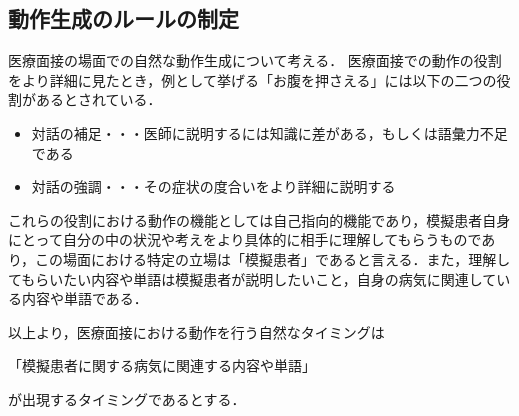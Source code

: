 \subsection{動作生成のルールの制定}\label{}
医療面接の場面での自然な動作生成について考える．
医療面接での動作の役割をより詳細に見たとき，例として挙げる「お腹を押さえる」には以下の二つの役割があるとされている．

 \begin{itemize}
  \item 対話の補足・・・医師に説明するには知識に差がある，もしくは語彙力不足である
  \item 対話の強調・・・その症状の度合いをより詳細に説明する
 \end{itemize}
\par
これらの役割における動作の機能としては自己指向的機能であり，模擬患者自身にとって自分の中の状況や考えをより具体的に相手に理解してもらうものであり，この場面における特定の立場は「模擬患者」であると言える．また，理解してもらいたい内容や単語は模擬患者が説明したいこと，自身の病気に関連している内容や単語である．

以上より，医療面接における動作を行う自然なタイミングは
  \centerline{「模擬患者に関する病気に関連する内容や単語」}
が出現するタイミングであるとする．
